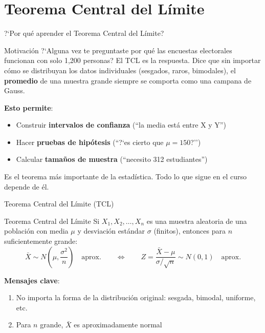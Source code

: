 \documentclass[aspectratio=169, 11pt]{beamer}
\begin{document}
\section{Teorema Central del Límite}

\begin{frame}{?`Por qu\'e aprender el Teorema Central del L\'imite?}
\begin{exampleblock}{Motivaci\'on}
?`Alguna vez te preguntaste por qu\'e las encuestas electorales funcionan con solo 1{,}200 personas? El TCL es la respuesta. Dice que sin importar c\'omo se distribuyan los datos individuales (sesgados, raros, bimodales), el \textbf{promedio} de una muestra grande siempre se comporta como una campana de Gauss.
\end{exampleblock}

\textbf{Esto permite}:
\begin{itemize}\setlength{\itemsep}{1pt}
  \item Construir \textbf{intervalos de confianza} (``la media est\'a entre X y Y'')
  \item Hacer \textbf{pruebas de hip\'otesis} (``?`es cierto que $\mu = 150$?'')
  \item Calcular \textbf{tama\~nos de muestra} (``necesito 312 estudiantes'')
\end{itemize}

\alert{Es el teorema m\'as importante de la estad\'istica. Todo lo que sigue en el curso depende de \'el.}
\end{frame}

\begin{frame}{Teorema Central del L\'imite (TCL)}
\begin{block}{Teorema Central del L\'imite}
Si $X_1, X_2, \ldots, X_n$ es una muestra aleatoria de una poblaci\'on con media $\mu$ y desviaci\'on est\'andar $\sigma$ (finitos), entonces para $n$ suficientemente grande:
\[
\bar{X} \sim N\!\left(\mu, \frac{\sigma^2}{n}\right) \quad \text{aprox.} \qquad \Longleftrightarrow \qquad Z = \frac{\bar{X} - \mu}{\sigma/\sqrt{n}} \sim N(0, 1) \quad \text{aprox.}
\]
\end{block}

\vspace{0.3em}
\textbf{Mensajes clave}:
\begin{enumerate}
\item \alert{No importa la forma de la distribuci\'on original}: sesgada, bimodal, uniforme, etc.
\item \alert{Para $n$ grande, $\bar{X}$ es aproximadamente normal}
\end{enumerate}
\end{frame}
\end{document}
